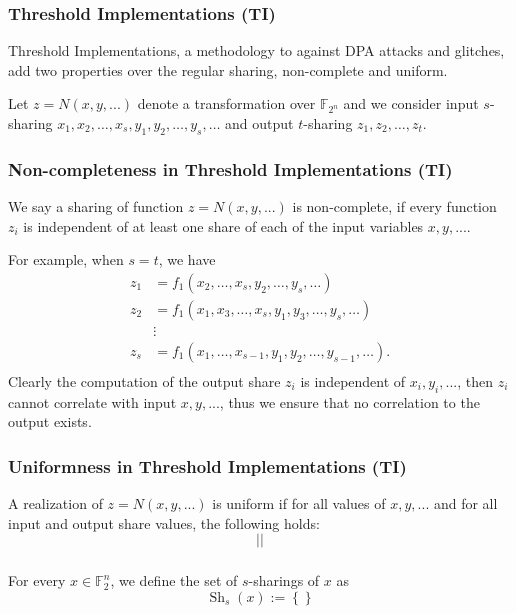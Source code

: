 \documentclass[
    aspectratio=169,                   %
]{beamer}
\newcommand{\F}{\mathbb{F}}
\newcommand{\Sh}{\operatorname{Sh}}
\begin{document}
    \begin{frame}
        \frametitle{Threshold Implementations (TI)}
    
        Threshold Implementations, a methodology to against DPA attacks and glitches, add two properties over 
        the regular sharing, non-complete and uniform.
        
        Let $ z=N(x,y,...) $ denote a transformation over $ \F_{2^n} $ 
        and we consider input $ s $-sharing $ x_1,x_2,\dots,x_s,y_1,y_2,\dots,y_s,\dots $ 
        and output $ t $-sharing $ z_1,z_2,\dots,z_t $. 

        
    \end{frame}
    \begin{frame}
        \frametitle{Non-completeness in Threshold Implementations (TI)}
        
        We say a sharing of function $ z=N(x,y,...) $ is non-complete, 
        if every function $ z_i $ is independent of at least one share of each of the input variables $ x,y,... $.

        For example, when $ s=t $, we have 
        \begin{align*}
            z_1&=f_1(x_2,\dots,x_s,y_2,\dots,y_s,\dots)\\
            z_2&=f_1(x_1,x_3,\dots,x_s,y_1,y_3,\dots,y_s,\dots)\\
            &\vdots\\
            z_s&=f_1(x_1,\dots,x_{s-1},y_1,y_2,\dots,y_{s-1},\dots).\\
        \end{align*}
        Clearly the computation of the output share $ z_i $ is independent of $ x_i,y_i,... $, 
        then $ z_i $ cannot correlate with input $ x,y,... $, thus we ensure that no correlation to the output 
        exists.
        
    \end{frame}
    
    \begin{frame}
        \frametitle{Uniformness in Threshold Implementations (TI)}
    
        A realization of $ z=N(x,y,...) $ is uniform if for all values of $ x,y,... $ 
        and for all input and output share values, the following holds:
        \[\lvert\rvert\]
    
    \end{frame}

    \begin{frame}
        \frametitle{}
    
        For every $ x\in\F_{2}^n $, we define the set of $ s $-sharings of $ x $ as 
        \[\Sh_s(x):=\left\{  \right\}\]
    
    \end{frame}
    \makebottom     %
\end{document}
